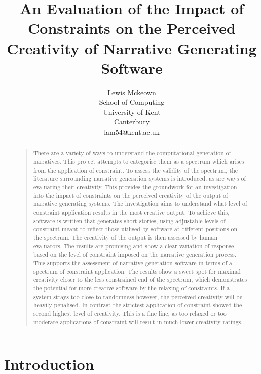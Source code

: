 \documentclass[letterpaper]{article}
\title{An Evaluation of the Impact of Constraints on the Perceived Creativity of Narrative Generating Software}
\author{Lewis Mckeown\\
School of Computing\\
University of Kent\\
Canterbury\\
lam54@kent.ac.uk\\
}
\begin{document}
 
\maketitle
\begin{abstract}
\begin{quote}
There are a variety of ways to understand the computational generation of narratives. This project attempts to categorise them as a spectrum which arises from the application of constraint. To assess the validity of the spectrum, the literature surrounding narrative generation systems is introduced, as are ways of evaluating their creativity. This provides the groundwork for an investigation into the impact of constraints on the perceived creativity of the output of narrative generating systems. The investigation aims to understand what level of constraint application results in the most creative output. To achieve this, software is written that generates short stories, using adjustable levels of constraint meant to reflect those utilised by software at different positions on the spectrum. The creativity of the output is then assessed by human evaluators. The results are promising and show a clear variation of response based on the level of constraint imposed on the narrative generation process. This supports the assessment of narrative generation software in terms of a spectrum of constraint application. The results show a sweet spot for maximal creativity closer to the less constrained end of the spectrum, which demonstrates the potential for more creative software by the relaxing of constraints. If a system strays too close to randomness however, the perceived creativity will be heavily penalised. In contrast the strictest application of constraint showed the second highest level of creativity. This is a fine line, as too relaxed or too moderate applications of constraint will result in much lower creativity ratings. \end{quote}
\end{abstract}

\section{Introduction}
\end{document}
